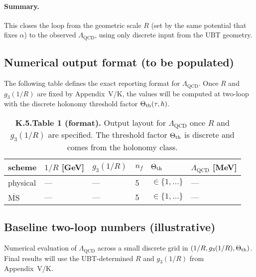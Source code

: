 \paragraph{Summary.}
This closes the loop from the geometric scale $R$ (set by the same potential that fixes $\alpha$) to the observed $\Lambda_{\mathrm{QCD}}$,
using only discrete input from the UBT geometry.

\subsection*{Numerical output format (to be populated)}
The following table defines the exact reporting format for $\Lambda_{\mathrm{QCD}}$. Once $R$ and $g_3(1/R)$ are fixed by Appendix~V/K, the values will be computed at two-loop with the discrete holonomy threshold factor $\Theta_{\rm th}(\tau,h)$.
\begin{table}[h]
\centering
\small
\caption{\textbf{K.5.Table 1 (format).} Output layout for $\Lambda_{\mathrm{QCD}}$ once $R$ and $g_3(1/R)$ are specified. The threshold factor $\Theta_{\rm th}$ is discrete and comes from the holonomy class.}
\begin{tabular}{llllll}
\hline
scheme & $1/R$ [GeV] & $g_3(1/R)$ & $n_f$ & $\Theta_{\rm th}$ & $\Lambda_{\mathrm{QCD}}$ [MeV] \\
\hline
physical & --- & --- & 5 & $\in\{1,\dots\}$ & --- \\
$\overline{\mathrm{MS}}$ & --- & --- & 5 & $\in\{1,\dots\}$ & --- \\
\hline
\end{tabular}
\end{table}

\subsection*{Baseline two-loop numbers (illustrative)}
Numerical evaluation of $\Lambda_{\mathrm{QCD}}$ across a small discrete grid in $(1/R, g_3(1/R), \Theta_{\rm th})$. Final results will use the UBT-determined $R$ and $g_3(1/R)$ from Appendix~V/K.

